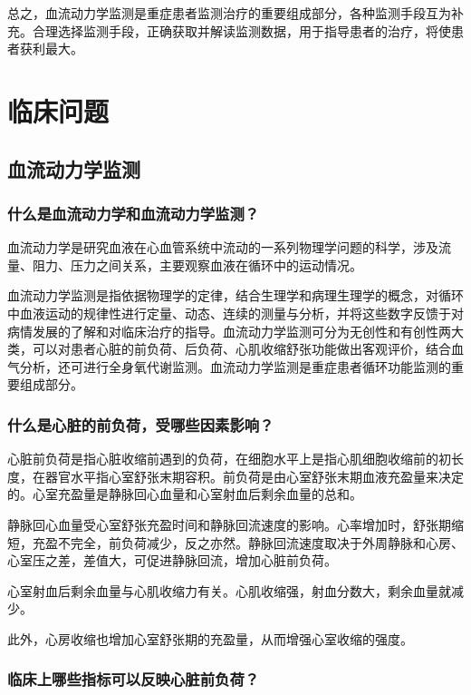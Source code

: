总之，血流动力学监测是重症患者监测治疗的重要组成部分，各种监测手段互为补充。合理选择监测手段，正确获取并解读监测数据，用于指导患者的治疗，将使患者获利最大。

\section{临床问题}

\subsection{血流动力学监测}

\subsubsection{什么是血流动力学和血流动力学监测？}

血流动力学是研究血液在心血管系统中流动的一系列物理学问题的科学，涉及流量、阻力、压力之间关系，主要观察血液在循环中的运动情况。

血流动力学监测是指依据物理学的定律，结合生理学和病理生理学的概念，对循环中血液运动的规律性进行定量、动态、连续的测量与分析，并将这些数字反馈于对病情发展的了解和对临床治疗的指导。血流动力学监测可分为无创性和有创性两大类，可以对患者心脏的前负荷、后负荷、心肌收缩舒张功能做出客观评价，结合血气分析，还可进行全身氧代谢监测。血流动力学监测是重症患者循环功能监测的重要组成部分。

\subsubsection{什么是心脏的前负荷，受哪些因素影响？}

心脏前负荷是指心脏收缩前遇到的负荷，在细胞水平上是指心肌细胞收缩前的初长度，在器官水平指心室舒张末期容积。前负荷是由心室舒张末期血液充盈量来决定的。心室充盈量是静脉回心血量和心室射血后剩余血量的总和。

静脉回心血量受心室舒张充盈时间和静脉回流速度的影响。心率增加时，舒张期缩短，充盈不完全，前负荷减少，反之亦然。静脉回流速度取决于外周静脉和心房、心室压之差，差值大，可促进静脉回流，增加心脏前负荷。

心室射血后剩余血量与心肌收缩力有关。心肌收缩强，射血分数大，剩余血量就减少。

此外，心房收缩也增加心室舒张期的充盈量，从而增强心室收缩的强度。

\subsubsection{临床上哪些指标可以反映心脏前负荷？}

